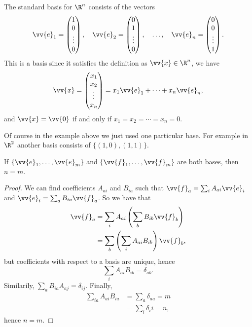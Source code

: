 \begin{example}
    The standard basis for $\R^n$ consists of the vectors
    $$
\vv{e}_1 = \begin{pmatrix}1 \\ 0\\ \vdots \\ 0\end{pmatrix}, \quad \vv{e}_2 = \begin{pmatrix}0 \\ 1\\ \vdots \\ 0\end{pmatrix}, \quad \dots, \quad \vv{e}_n = \begin{pmatrix}0 \\ 0\\ \vdots \\ 1\end{pmatrix}.
    $$
    This is a basis since it satisfies the definition as $\vv{x} \in \R^n$, we have
    $$
\vv{x} = \begin{pmatrix}x_1 \\ x_2\\ \vdots \\ x_n\end{pmatrix} = x_1 \vv{e}_1 + \cdots + x_n \vv{e}_n,
    $$
    and $\vv{x} = \vv{0}$ if and only if $x_1 = x_2 = \cdots = x_n = 0$. 
\end{example}

Of course in the example above we just used one particular base. 
For example in $\R^2$ another basis consists of $\{(1, 0), (1, 1)\}$. 

\begin{theorem}
    If $\{\vv{e}_1, \dots, \vv{e}_m\}$ and $\{\vv{f}_1, \dots, \vv{f}_m\}$ are both bases, then $n = m$.
\end{theorem}
\begin{proof}
    We can find coefficients $A_{ai}$ and $B_{ia}$ such that $\vv{f}_a = \sum_i A_{ai} \vv{e}_i$ and $\vv{e}_i = \sum_a B_{ia} \vv{f}_a$. So we have that
    \begin{align*}
    \vv{f}_a &= \sum_i A_{ai} \left(\sum_b B_{ib} \vv{f}_b\right) \\
        &= \sum_b \left(\sum_{i} A_{ai} B_{ib}\right)\vv{f}_b,
\end{align*}
    but coefficients with respect to a basis are unique, hence
    $$
    \sum_{i} A_{ai} B_{ib} = \delta_{ab}.
    $$
    Similarily, $\sum_{a} B_{ia} A_{aj} = \delta_{ij}$. Finally,
    \begin{align*}
        \sum_{ia} A_{ai} B_{ia} &= \sum_{a} \delta_{aa} = m \\
        &= \sum_i \delta_ii = n,
     \end{align*}
     hence $n = m$.
\end{proof}

